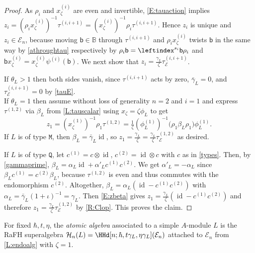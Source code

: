 \documentclass[a4paper,11pt]{amsart}
\numberwithin{equation}{subsection}
\theoremstyle{definition}
\theoremstyle{theorem}
\theoremstyle{remark}
\newcommand\bb{\mathsf{b}}
\newcommand\op{\operatorname}
\newcommand\taui[1][i]{\tau^{(#1)}}
\newcommand{\Bo}{\mathbb{B}}
\begin{document}
\begin{proof}
  As $\rho_i$ and $x_\zeta^{(i)}$ are even and invertible, \autoref{E:tauaction} implies
  $z_i=(\rho_ix_\zeta^{(i)})^{-1}\tau^{(i,i+1)}=(x_\zeta^{(i)})^{-1}\rho_i\tau^{(i,i+1)}$. Hence $z_i$ is unique and  $z_i\in\mathcal E_n$, because
 moving $\bb\in\Bo$ through $\tau^{(i,i+1)}$ and $\rho_ix_\zeta^{(i)}$ twists $\bb$ in the same way by \autoref{athroughtau}
  respectively by $\rho_i\bb=\leftindex^{s_i}\bb \rho_i$ and
  $\bb x_\zeta^{(i)}=x_\zeta^{(i)}\psi^{(i)}(\bb)$. We next show that $z_i=\tfrac{\gamma_L}{\zeta}\tau^{(i,i+1)}_{\mathcal E}$.


  If $\theta_L>1$ then both sides vanish, since $\taui[i,i+1]$ acts by zero, $\bar\gamma_L=0$, and  $\tau^{(i,i+1)}_{\mathcal E}=0$ by \autoref{tauE}.\\
  \noindent  If $\theta_L=1$ then assume without loss of generality $n=2$ and $i=1$ and express $\tau^{(1,2)}$ via $\beta_L$ from \autoref{L:tauscalar} using $x_\zeta=\zeta\phi_L$ to get
  \begin{equation}\label{E:zbeta}
    z_1=(x^{(1)}_\zeta)^{-1}\rho_1\tau^{(1,2)}
      =\tfrac1\zeta (\phi^{(1)}_L)^{-1}\bigl(\rho_1\beta_L\rho_1\bigr)\phi^{(1)}_L.
  \end{equation}
    If $L$ is of type $\mathtt M$, then $\beta_L=\bar\gamma_L\op{id}$, so $z_1=\tfrac{\gamma_L}{\zeta}=\tfrac{\gamma_L}{\zeta}\tau^{(1,2)}_{\mathcal E}$ as desired.

  \noindent If $L$ is of type $\mathtt Q$, let $c^{(1)}=c\otimes\op{id}$, $c^{(2)}=\op{id}\otimes c$ with $c$ as in \autoref{types}. Then, by  \autoref{gammaprime}, $\beta_L=\alpha_L\op{id}+\alpha'_Lc^{(1)}c^{(2)}$. We get $\alpha'_L=-\alpha_L$ since $\beta_Lc^{(1)}=c^{(2)}\beta_L$, because  $\tau^{(1,2)}$ is even and thus commutes with the endomorphism $c^{(2)}$. Altogether, $\beta_L=\alpha_L(\op{id}-c^{(1)}c^{(2)})$ with $\alpha_L=\bar\gamma_L(1+\iota)^{-1}=\gamma_L$. Then \autoref{E:zbeta} gives $z_1=\tfrac{\gamma_L}{\zeta}(\op{id}-c^{(1)}c^{(2)})$ and therefore $z_1=\tfrac{\gamma_L}{\zeta}\tau^{(1,2)}_{\mathcal E}$ by \autoref{R:Clop}. This proves the claim.
 \end{proof}



\begin{Definition}\label{D:block}
For fixed $\hbar, t,\eta$, the  \emph{atomic algebra} associated to a simple $A$-module $L$ is the RaFH
  superalgebra
  $\mathcal H_n(L)=\HHd[n;\hbar, t\gamma_L, \eta\gamma_L](\mathcal E_n)$
  attached to $\mathcal E_n$ from \autoref{L:endoalg} with $\zeta=1$.
\end{Definition}
\end{document}
